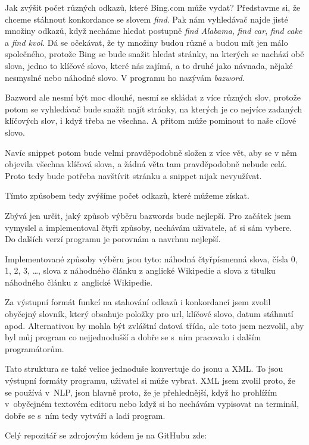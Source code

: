 Jak zvýšit počet různých odkazů, které Bing.com může vydat? Představme si,
že chceme stáhnout konkordance se slovem {\it find}. Pak nám vyhledávač
najde jisté množiny odkazů, když necháme hledat postupně {\it find Alabama}, {\it
find car}, {\it find cake} a {\it find kvol}. Dá se očekávat, že ty množiny
budou různé a budou mít jen málo společného, protože Bing se bude snažit hledat stránky,
na kterých se nachází obě slova, jedno to klíčové slovo, které nás zajímá,
a to druhé jako návnada, nějaké nesmyslné nebo náhodné slovo. V programu ho
nazývám {\it bazword}.

Bazword ale nesmí být moc dlouhé, nesmí se skládat z více různých slov,
protože potom se vyhledávač bude snažit najít stránky, na kterých je co
nejvíce zadaných klíčových slov, i když třeba ne všechna. A přitom může
pominout to naše cílové slovo.

Navíc snippet potom bude velmi pravděpodobně složen z více vět, aby se
v něm objevila všechna klíčová slova, a žádná věta tam pravděpodobně nebude
celá. Proto tedy bude potřeba navštívit stránku a snippet nijak nevyužívat.

Tímto způsobem tedy zvýšíme počet odkazů, které můžeme získat.

Zbývá jen určit, jaký způsob výběru bazwords bude nejlepší. Pro začátek
jsem vymyslel a implementoval čtyři způsoby, nechávám uživatele, ať si sám
vybere. Do dalších verzí programu je porovnám a navrhnu nejlepší.

Implementované způsoby výběru jsou tyto: náhodná čtyřpísmenná slova, čísla
0, 1, 2, 3, \dots, slova z náhodného článku z anglické Wikipedie a slova z titulku
náhodného článku z~anglické Wikipedie.

Za výstupní formát funkcí na stahování odkazů i konkordancí jsem zvolil
obyčejný slovník, který obsahuje položky pro url, klíčové slovo, datum
stáhnutí apod. Alternativou by mohla být zvláštní datová třída, ale toto
jsem nezvolil, aby byl můj program co nejjednodušší a dobře se s~ním
pracovalo i dalším programátorům.

Tato struktura se také velice jednoduše konvertuje do jsonu a XML. To jsou
výstupní formáty programu, uživatel si může vybrat. XML jsem zvolil proto,
že se používá v~NLP, json hlavně proto, že je přehlednější, když ho
prohlížím v~obyčejném textovém editoru nebo když si ho nechávám vypisovat
na terminál, dobře se s~ním tedy vytváří a ladí program.


Celý repozitář se zdrojovým kódem je na GitHubu zde:

